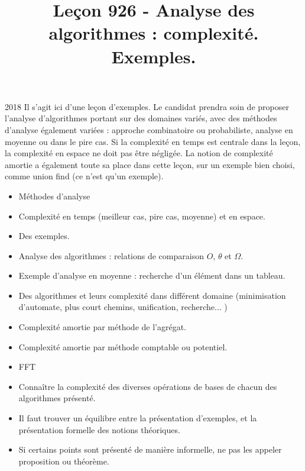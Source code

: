 \documentclass{agregfiche}
\title{Leçon 926 - Analyse des algorithmes : complexité. Exemples.}
\begin{document}
\maketitle

\secrapports
\begin{rapport}{2018}
    Il s’agit ici d’une leçon d’exemples. Le candidat prendra soin de proposer l’analyse d’algorithmes portant
    sur des domaines variés, avec des méthodes d’analyse également variées : approche combinatoire ou
    probabiliste, analyse en moyenne ou dans le pire cas.
    Si la complexité en temps est centrale dans la leçon, la complexité en espace ne doit pas être négligée.
    La notion de complexité amortie a également toute sa place dans cette leçon, sur un exemple bien
    choisi, comme union find (ce n’est qu’un exemple).
\end{rapport}

\secindispensables

\begin{itemize}
	\item Méthodes d'analyse
    \item Complexité en temps (meilleur cas, pire cas, moyenne) et en espace.
    \item Des exemples.
\end{itemize}

\secasavoir

\begin{itemize}
	\item Analyse des algorithmes : relations de comparaison $O$, $\theta$ et $\Omega$.
    \item Exemple d’analyse en moyenne : recherche d’un élément dans un tableau.
    \item Des algorithmes et leurs complexité dans différent domaine (minimisation d'automate, plus court chemins, unification, recherche... )
    	\item Complexité amortie par méthode de l'agrégat.
\end{itemize}

\secidees

\begin{itemize}
    	\item Complexité amortie par méthode comptable ou potentiel.
        \item FFT
\end{itemize}

\secpieges

\begin{itemize}
	\item Connaître la complexité des diverses opérations de bases de chacun des algorithmes présenté.
    \item Il faut trouver un équilibre entre la présentation d'exemples, et la présentation formelle des notions théoriques.
    \item Si certains points sont présenté de manière informelle, ne pas les appeler proposition ou théorème.
\end{itemize}
\end{document}
